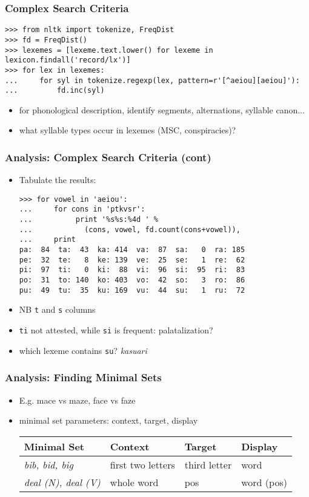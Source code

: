 \documentclass{beamer}             %
\begin{document}
\begin{frame}[fragile]
\frametitle{Complex Search Criteria}
\scriptsize
\begin{verbatim}
>>> from nltk import tokenize, FreqDist
>>> fd = FreqDist()
>>> lexemes = [lexeme.text.lower() for lexeme in lexicon.findall('record/lx')]
>>> for lex in lexemes:
...     for syl in tokenize.regexp(lex, pattern=r'[^aeiou][aeiou]'):
...         fd.inc(syl)
\end{verbatim}

\normalsize
\begin{itemize}
\item for phonological description, identify segments, alternations,
  syllable canon...
\item what syllable types occur in lexemes (MSC, conspiracies)?
\end{itemize}

\end{frame}

\begin{frame}[fragile]
\frametitle{Analysis: Complex Search Criteria (cont)}

\begin{itemize}
\item Tabulate the results:

\scriptsize
\begin{verbatim}
>>> for vowel in 'aeiou':
...     for cons in 'ptkvsr':
...          print '%s%s:%4d ' %
...            (cons, vowel, fd.count(cons+vowel)),
...     print
pa:  84  ta:  43  ka: 414  va:  87  sa:   0  ra: 185 
pe:  32  te:   8  ke: 139  ve:  25  se:   1  re:  62 
pi:  97  ti:   0  ki:  88  vi:  96  si:  95  ri:  83 
po:  31  to: 140  ko: 403  vo:  42  so:   3  ro:  86 
pu:  49  tu:  35  ku: 169  vu:  44  su:   1  ru:  72 
\end{verbatim}

\small
\item NB \texttt{t} and \texttt{s} columns
\item \texttt{ti} not attested, while \texttt{si} is frequent: palatalization?
\item which lexeme contains \texttt{su}?  \textit{kasuari}
\end{itemize}
\end{frame}


\begin{frame}
\frametitle{Analysis: Finding Minimal Sets}
\begin{itemize}
\item E.g. mace vs maze, face vs faze
\item minimal set parameters: context, target, display
\vfil
\small

\begin{tabular}{l|lll}
\textbf{Minimal Set} &     \textbf{Context} &  \textbf{Target} & \textbf{Display} \\ \hline
\textit{bib, bid, big} &   first two letters&  third letter    & word\\
\textit{deal (N), deal (V)} & whole word    &  pos             & word (pos)
\end{tabular}
\end{itemize}
\end{frame}
\end{document}

